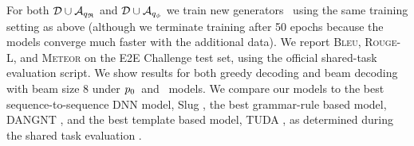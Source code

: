 
For both $\mathcal{D} \cup {\ensuremath{\mathcal{A}}}_{{q_{\mathfrak{R}} }}$ and 
$\mathcal{D} \cup {\ensuremath{\mathcal{A}}}_{{q_{\phi} }}$ we train new generators \auggen~using 
the same training setting as above (although we terminate training after 50 
epochs
because the models converge much faster with the additional data).
We report \textsc{Bleu}, \textsc{Rouge-L}, and \textsc{Meteor} on the E2E Challenge test set, using the official shared-task evaluation script.
We show results for both greedy decoding and beam decoding with beam size 8
under $p_0$~and
\auggen~models. We compare our models to the best sequence-to-sequence DNN
model, Slug \citep{juraska2018}, the best grammar-rule based model, 
DANGNT \citep{nguyen2018},
and the best template based model, TUDA \citep{puzikov2018}, as determined during 
the shared task evaluation \citep{dusek2019}.


